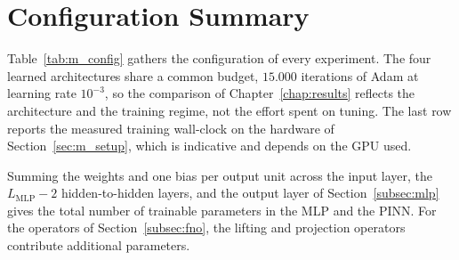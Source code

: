 \section{Configuration Summary}
\label{sec:m_config}

Table~\ref{tab:m_config} gathers the configuration of every experiment. The four learned architectures share a common budget, $15.000$ iterations of Adam at learning rate $10^{-3}$, so the comparison of Chapter~\ref{chap:results} reflects the architecture and the training regime, not the effort spent on tuning. The last row reports the measured training wall-clock on the hardware of Section~\ref{sec:m_setup}, which is indicative and depends on the GPU used.

Summing the weights and one bias per output unit across the input layer, the $L_{\mathrm{MLP}}-2$ hidden-to-hidden layers, and the output layer of Section~\ref{subsec:mlp} gives the total number of trainable parameters in the MLP and the PINN. For the operators of Section~\ref{subsec:fno}, the lifting and projection operators contribute additional parameters.

